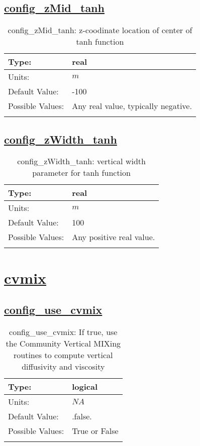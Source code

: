 \subsection[config\_zMid\_tanh]{\hyperref[sec:nm_tab_vmix_tanh]{config\_zMid\_tanh}}
\label{subsec:nm_sec_config_zMid_tanh}
\begin{center}
\begin{longtable}{| p{2.0in} || p{4.0in} |}
    \hline
    Type: & real \\
    \hline
    Units: & $m$ \\
    \hline
    Default Value: & -100 \\
    \hline
    Possible Values: & Any real value, typically negative. \\
    \hline
    \caption{config\_zMid\_tanh: z-coodinate location of center of tanh function}
\end{longtable}
\end{center}
\subsection[config\_zWidth\_tanh]{\hyperref[sec:nm_tab_vmix_tanh]{config\_zWidth\_tanh}}
\label{subsec:nm_sec_config_zWidth_tanh}
\begin{center}
\begin{longtable}{| p{2.0in} || p{4.0in} |}
    \hline
    Type: & real \\
    \hline
    Units: & $m$ \\
    \hline
    Default Value: & 100 \\
    \hline
    Possible Values: & Any positive real value. \\
    \hline
    \caption{config\_zWidth\_tanh: vertical width parameter for tanh function}
\end{longtable}
\end{center}
\section[cvmix]{\hyperref[sec:nm_tab_cvmix]{cvmix}}
\label{sec:nm_sec_cvmix}
\subsection[config\_use\_cvmix]{\hyperref[sec:nm_tab_cvmix]{config\_use\_cvmix}}
\label{subsec:nm_sec_config_use_cvmix}
\begin{center}
\begin{longtable}{| p{2.0in} || p{4.0in} |}
    \hline
    Type: & logical \\
    \hline
    Units: & $NA$ \\
    \hline
    Default Value: & .false. \\
    \hline
    Possible Values: & True or False \\
    \hline
    \caption{config\_use\_cvmix: If true, use the Community Vertical MIXing routines to compute vertical diffusivity and viscosity}
\end{longtable}
\end{center}
